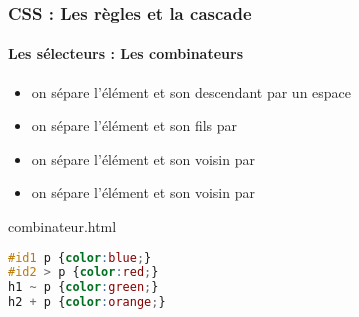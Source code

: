 \documentclass[xcolor=table]{beamer}
\begin{document}
\begin{frame}[fragile]
\frametitle{CSS : Les règles et la cascade}
\framesubtitle{Les sélecteurs : Les combinateurs}

\begin{minipage}{0.60\textwidth} 
	\begin{itemize}
		\item {} on sépare l'élément et son descendant par un espace
		\item {} on sépare l'élément et son fils par \keyword{>}
		\item {} on sépare l'élément et son voisin par \keyword{\textasciitilde}
		\item {} on sépare l'élément et son voisin par \keyword{+}
	\end{itemize}
\end{minipage}
%
\begin{minipage}{0.38\textwidth}
\begin{block}{combinateur.html}
\lstset{escapeinside=**}
\scriptsize\bfseries
\begin{lstlisting}[language={CSS}]
#id1 p {color:blue;}
#id2 > p {color:red;}
h1 ~ p {color:green;}
h2 + p {color:orange;}
\end{lstlisting}
\end{block}
\end{minipage}
\end{frame}
\end{document}
